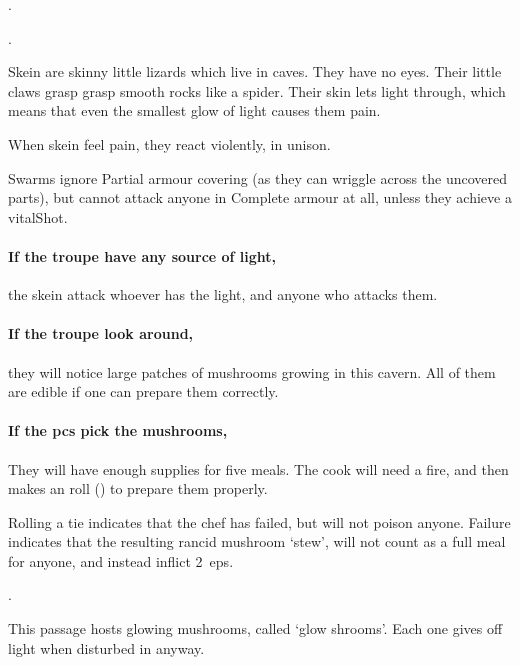 \begin{multicols}{2}
.

.


Skein are skinny little lizards which live in caves.
They have no eyes.
Their little claws grasp grasp smooth rocks like a spider.
Their skin lets light through, which means that even the smallest glow of light causes them pain.

When skein feel pain, they react violently, in unison.

\skeinSwarm

Swarms ignore Partial armour covering (as they can wriggle across the uncovered parts), but cannot attack anyone in Complete armour at all, unless they achieve a \gls{vitalShot}.%

\paragraph{If the troupe have any source of light,}
the skein attack whoever has the light, and anyone who attacks them.

\paragraph{If the troupe look around,}
they will notice large patches of mushrooms growing in this cavern.
All of them are edible if one can prepare them correctly.

\paragraph{If the \glspl{pc} pick the mushrooms,}
They will have enough supplies for five meals.
The cook will need a fire,%
and then makes an  roll (\tn[10]) to prepare them properly.

Rolling a tie indicates that the chef has failed, but will not poison anyone.
Failure indicates that the resulting rancid mushroom `stew', will not count as a full meal for anyone, and instead inflict 2~\glspl{ep}.

.


This passage hosts glowing mushrooms, called `glow shrooms'.%
Each one gives off light when disturbed in anyway.


\end{multicols}
